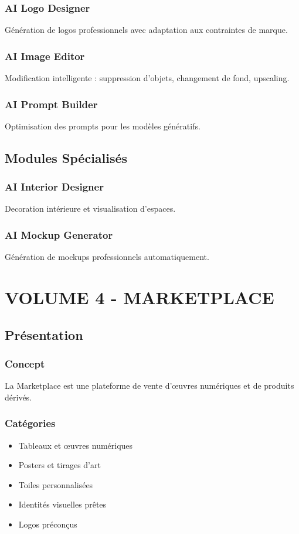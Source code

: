 \documentclass[12pt,a4paper,oneside]{book}
\begin{document}
\section{AI Logo Designer}
Génération de logos professionnels avec adaptation aux contraintes de marque.

\section{AI Image Editor}
Modification intelligente : suppression d'objets, changement de fond, upscaling.

\section{AI Prompt Builder}
Optimisation des prompts pour les modèles génératifs.

\chapter{Modules Spécialisés}

\section{AI Interior Designer}
Decoration intérieure et visualisation d'espaces.

\section{AI Mockup Generator}
Génération de mockups professionnels automatiquement.

\part{VOLUME 4 - MARKETPLACE}

\chapter{Présentation}

\section{Concept}
La Marketplace est une plateforme de vente d'œuvres numériques et de produits dérivés.

\section{Catégories}
\begin{itemize}
\item Tableaux et œuvres numériques
\item Posters et tirages d'art
\item Toiles personnalisées
\item Identités visuelles prêtes
\item Logos préconçus
\end{itemize}
\end{document}
